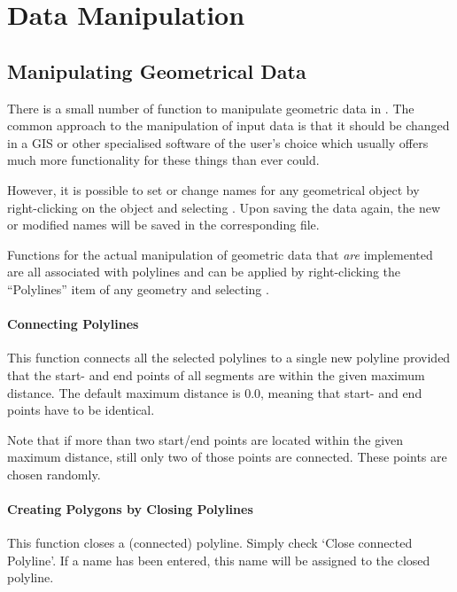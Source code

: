 \chapter{Data Manipulation}

\section{Manipulating Geometrical Data}

There is a small number of function to manipulate geometric data in \ogs. The common approach to the manipulation of \ogs input data is that it should be changed in a GIS or other specialised software of the user's choice which usually offers much more functionality for these things than \ogs ever could.

However, it is possible to set or change names for any geometrical object by right-clicking on the object and selecting . Upon saving the data again, the new or modified names will be saved in the corresponding file.

Functions for the actual manipulation of geometric data that \emph{are} implemented are all associated with polylines and can be applied by right-clicking the ``Polylines'' item of any geometry and selecting .

\subsubsection{Connecting Polylines}
This function connects all the selected polylines to a single new polyline provided that the start- and end points of all segments are within the given maximum distance. The default maximum distance is $0.0$, meaning that start- and end points have to be identical.

Note that if more than two start/end points are located within the given maximum distance, still only two of those points are connected. These points are chosen randomly.

\subsubsection{Creating Polygons by Closing Polylines}
This function closes a (connected) polyline. Simply check `Close connected Polyline'. If a name has been entered, this name will be assigned to the closed polyline.

